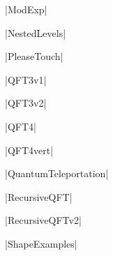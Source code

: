 \documentclass{article}
\begin{document}
|ModExp|
\begin{figure}[ht]
\caption{\protect{}}

\end{figure}

|NestedLevels|
\begin{figure}[ht]
\caption{\protect{}}

\end{figure}

|PleaseTouch|
\begin{figure}[ht]
\caption{\protect{}}

\end{figure}

|QFT3v1|
\begin{figure}[ht]
\caption{\protect{}}

\end{figure}

|QFT3v2|
\begin{figure}[ht]
\caption{\protect{}}

\end{figure}

|QFT4|
\begin{figure}[ht]
\caption{\protect{}}

\end{figure}

|QFT4vert|
\begin{figure}[ht]
\caption{\protect{}}

\end{figure}
\clearpage

|QuantumTeleportation|
\begin{figure}[ht]
\caption{\protect{}}

\end{figure}

|RecursiveQFT|
\begin{figure}[ht]
\caption{\protect{}}

\end{figure}

|RecursiveQFTv2|
\begin{figure}[ht]
\caption{\protect{}}

\end{figure}

|ShapeExamples|
\begin{figure}[ht]
\caption{\protect{}}

\end{figure}
\end{document}
